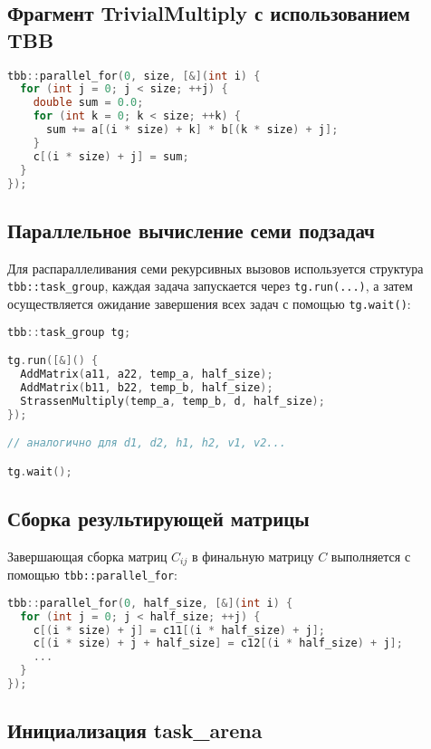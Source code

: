\documentclass[14pt,a4paper]{extarticle}
\begin{document}
\subsection*{Фрагмент TrivialMultiply с использованием TBB}

\begin{lstlisting}[language=C++]
tbb::parallel_for(0, size, [&](int i) {
  for (int j = 0; j < size; ++j) {
    double sum = 0.0;
    for (int k = 0; k < size; ++k) {
      sum += a[(i * size) + k] * b[(k * size) + j];
    }
    c[(i * size) + j] = sum;
  }
});
\end{lstlisting}

\subsection*{Параллельное вычисление семи подзадач}

Для распараллеливания семи рекурсивных вызовов используется структура \texttt{tbb::task\_group}, каждая задача запускается через \texttt{tg.run(...)}, а затем осуществляется ожидание завершения всех задач с помощью \texttt{tg.wait()}:

\begin{lstlisting}[language=C++]
tbb::task_group tg;

tg.run([&]() {
  AddMatrix(a11, a22, temp_a, half_size);
  AddMatrix(b11, b22, temp_b, half_size);
  StrassenMultiply(temp_a, temp_b, d, half_size);
});

// аналогично для d1, d2, h1, h2, v1, v2...

tg.wait();
\end{lstlisting}

\subsection*{Сборка результирующей матрицы}

Завершающая сборка матриц $C_{ij}$ в финальную матрицу $C$ выполняется с помощью \texttt{tbb::parallel\_for}:

\begin{lstlisting}[language=C++]
tbb::parallel_for(0, half_size, [&](int i) {
  for (int j = 0; j < half_size; ++j) {
    c[(i * size) + j] = c11[(i * half_size) + j];
    c[(i * size) + j + half_size] = c12[(i * half_size) + j];
    ...
  }
});
\end{lstlisting}

\subsection*{Инициализация task\_arena}
\end{document}

